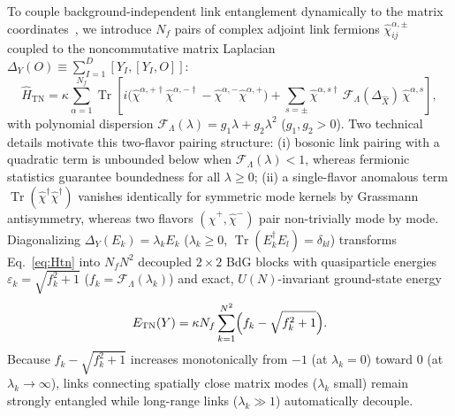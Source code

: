 \documentclass[11pt,a4paper]{article}
\DeclareMathOperator{\Tr}{Tr}
\begin{document}
To couple background-independent link entanglement dynamically to the matrix coordinates~\cite{Frenkel2024}, we introduce $N_f$ pairs of complex adjoint link fermions $\hat{\chi}^{\alpha,\pm}_{ij}$ coupled to the noncommutative matrix Laplacian $\Delta_Y(O) \equiv \sum_{I=1}^{D} [Y_I, [Y_I, O]]$:
\begin{equation}
  \hat{H}_{\mathrm{TN}} = \kappa \sum_{\alpha=1}^{N_f} \Tr\!\left[
    i\big(\hat{\chi}^{\alpha,+\dagger}\hat{\chi}^{\alpha,-\dagger} - \hat{\chi}^{\alpha,-}\hat{\chi}^{\alpha,+}\big)
    + \sum_{s=\pm} \hat{\chi}^{\alpha,s\dagger}\,\mathcal{F}_\Lambda(\Delta_{\hat{X}})\,\hat{\chi}^{\alpha,s}
  \right],
  \label{eq:Htn}
\end{equation}
with polynomial dispersion $\mathcal{F}_\Lambda(\lambda) = g_1\lambda + g_2\lambda^2$ ($g_1, g_2 > 0$). Two technical details motivate this two-flavor pairing structure: (i) bosonic link pairing with a quadratic term is unbounded below when $\mathcal{F}_\Lambda(\lambda) < 1$, whereas fermionic statistics guarantee boundedness for all $\lambda \ge 0$; (ii) a single-flavor anomalous term $\Tr(\hat{\chi}^\dagger \hat{\chi}^\dagger)$ vanishes identically for symmetric mode kernels by Grassmann antisymmetry, whereas two flavors $(\hat{\chi}^+, \hat{\chi}^-)$ pair non-trivially mode by mode. Diagonalizing $\Delta_Y(E_k) = \lambda_k E_k$ ($\lambda_k \ge 0$, $\Tr(E_k^\dagger E_l)=\delta_{kl}$) transforms Eq.~\eqref{eq:Htn} into $N_f N^2$ decoupled $2\times 2$ BdG blocks with quasiparticle energies $\varepsilon_k = \sqrt{f_k^2 + 1}$ ($f_k = \mathcal{F}_\Lambda(\lambda_k)$) and exact, $U(N)$-invariant ground-state energy
\begin{equation}
  E_{\mathrm{TN}}(Y) = \kappa N_f \sum_{k=1}^{N^2} \Bigl(f_k - \sqrt{f_k^2 + 1}\Bigr).
  \label{eq:Etn}
\end{equation}
Because $f_k - \sqrt{f_k^2+1}$ increases monotonically from $-1$ (at $\lambda_k=0$) toward $0$ (at $\lambda_k \to \infty$), links connecting spatially close matrix modes ($\lambda_k$ small) remain strongly entangled while long-range links ($\lambda_k \gg 1$) automatically decouple.
\end{document}
